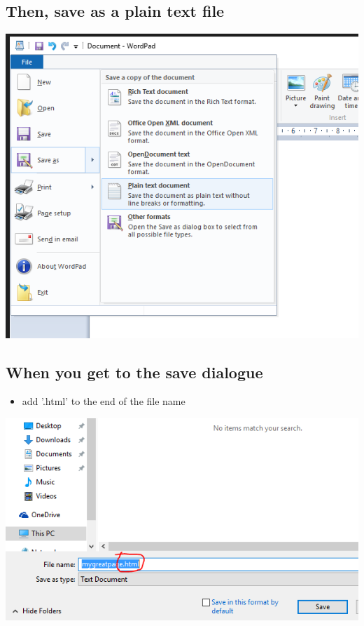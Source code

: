 \documentclass[11pt]{article}
\begin{document}
\subsection*{Then, save as a plain text file}
\label{sec:orgheadline16}
\includegraphics[width=.9\linewidth]{../../img/plaintextdoc.PNG}
\subsection*{When you get to the save dialogue}
\label{sec:orgheadline17}
\begin{itemize}
\item add '.html' to the end of the file name
\end{itemize}
\includegraphics[width=.9\linewidth]{../../img/saveashtml.PNG}
\end{document}
